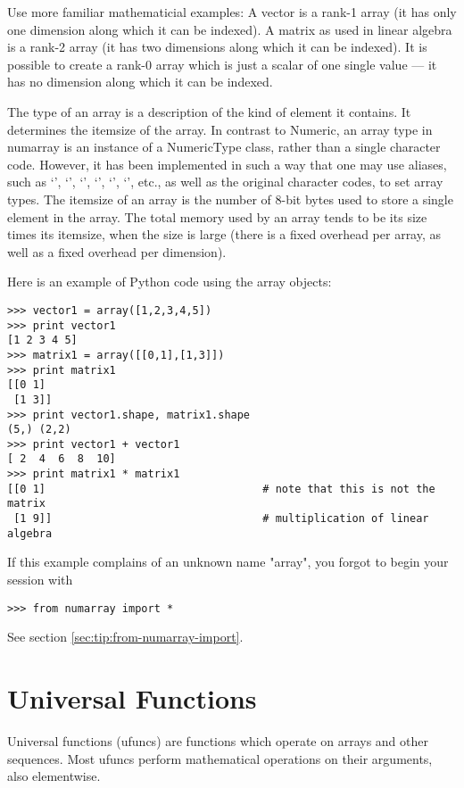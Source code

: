 Use more familiar mathematicial examples: A vector is a rank-1 array
(it has only one dimension along which it can be indexed). A matrix as used in
linear algebra is a rank-2 array (it has two dimensions along which it can be
indexed). It is possible to create a rank-0 array which is just a scalar of 
one single value --- it has no dimension along which it can be indexed.

The type of an array is a description of the kind of element it contains. It
determines the itemsize of the array.  In contrast to Numeric, an array type in
numarray is an instance of a NumericType class, rather than a single character
code. However, it has been implemented in such a way that one may use aliases,
such as `', `', `', `',
`', `', etc., as well as the original character
codes, to set array types.  The itemsize of an array is the number of 8-bit
bytes used to store a single element in the array. The total memory used by an
array tends to be its size times its itemsize, when the size is large (there
is a fixed overhead per array, as well as a fixed overhead per dimension).

Here is an example of Python code using the array objects:
\begin{verbatim}
>>> vector1 = array([1,2,3,4,5])
>>> print vector1
[1 2 3 4 5]
>>> matrix1 = array([[0,1],[1,3]])
>>> print matrix1
[[0 1]
 [1 3]]
>>> print vector1.shape, matrix1.shape
(5,) (2,2)
>>> print vector1 + vector1
[ 2  4  6  8  10]
>>> print matrix1 * matrix1
[[0 1]                                  # note that this is not the matrix
 [1 9]]                                 # multiplication of linear algebra
\end{verbatim}
If this example complains of an unknown name "array", you forgot to begin
your session with
\begin{verbatim}
>>> from numarray import *
\end{verbatim}
See section \ref{sec:tip:from-numarray-import}.


\section{Universal Functions}
\label{sec:universal-functions}

Universal functions (ufuncs) are functions which operate on arrays and other
sequences. Most ufuncs perform mathematical operations on their arguments, also
elementwise.


